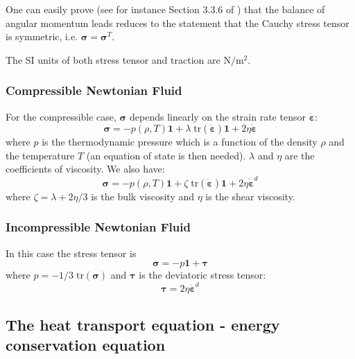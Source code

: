 One can easily prove (see for instance Section 3.3.6 of \cite{grbl09}) that the balance 
of angular momentum leads reduces to the statement that the Cauchy stress tensor 
is symmetric, i.e. ${\bm \sigma}={\bm \sigma}^T$.

The SI units of both stress tensor and traction are $\text{N}/\text{m}^2$.

\subsubsection{Compressible Newtonian Fluid}

For the compressible case, ${\bm \sigma}$ 
depends linearly on the strain rate tensor $\dot{\bm \varepsilon}$: 
\begin{equation}
{\bm \sigma} = -p(\rho,T) {\bm 1} + \lambda \; \text{tr} (\dot{\bm \varepsilon}) {\bm 1} + 2\eta \dot{\bm \varepsilon}
\end{equation}
where $p$ is the thermodynamic pressure which is a function of the density $\rho$ and the temperature $T$ (an equation of state is then needed). $\lambda$ and $\eta$ are the coefficients of viscosity. 
We also have:
\begin{equation}
{\bm \sigma} = -p(\rho,T) {\bm 1} + \zeta \; \text{tr} (\dot{\bm \varepsilon}) {\bm 1} + 2\eta \dot{\bm \varepsilon}^d
\end{equation}
where $\zeta=\lambda+2\eta/3$ is the bulk viscosity and $\eta$ is the shear viscosity.



\subsubsection{Incompressible Newtonian Fluid}

In this case the stress tensor is 
\begin{equation}
{\bm \sigma}=-p {\bm 1} + {\bm \tau}
\end{equation}
where $p=-1/3 \; \text{tr} (\bm \sigma)$ and ${\bm \tau}$ is the deviatoric stress tensor:
\begin{equation}
{\bm \tau}=2\eta \dot{\bm \varepsilon}^d
\end{equation}


\subsection{The heat transport equation - energy conservation equation}

